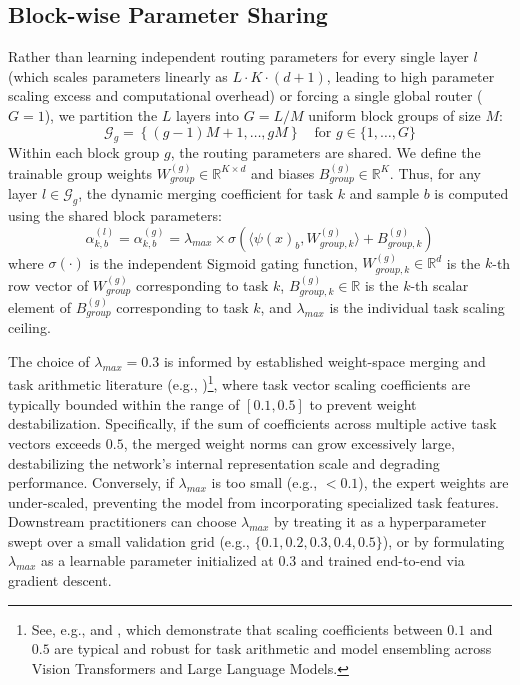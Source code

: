 \subsection{Block-wise Parameter Sharing}
Rather than learning independent routing parameters for every single layer $l$ (which scales parameters linearly as $L \cdot K \cdot (d + 1)$, leading to high parameter scaling excess and computational overhead) or forcing a single global router ($G=1$), we partition the $L$ layers into $G = L / M$ uniform block groups of size $M$:
\begin{equation}
    \mathcal{G}_g = \left\{ (g-1)M + 1, \dots, gM \right\} \quad \text{for } g \in \{1, \dots, G\}
\end{equation}
Within each block group $g$, the routing parameters are shared. We define the trainable group weights $W_{group}^{(g)} \in \mathbb{R}^{K \times d}$ and biases $B_{group}^{(g)} \in \mathbb{R}^K$. Thus, for any layer $l \in \mathcal{G}_g$, the dynamic merging coefficient for task $k$ and sample $b$ is computed using the shared block parameters:
\begin{equation}
    \alpha_{k, b}^{(l)} = \alpha_{k, b}^{(g)} = \lambda_{max} \times \sigma \left( \langle \psi(x)_b, W_{group, k}^{(g)} \rangle + B_{group, k}^{(g)} \right)
\end{equation}
where $\sigma(\cdot)$ is the independent Sigmoid gating function, $W_{group, k}^{(g)} \in \mathbb{R}^d$ is the $k$-th row vector of $W_{group}^{(g)}$ corresponding to task $k$, $B_{group, k}^{(g)} \in \mathbb{R}$ is the $k$-th scalar element of $B_{group}^{(g)}$ corresponding to task $k$, and $\lambda_{max}$ is the individual task scaling ceiling. 

The choice of $\lambda_{max} = 0.3$ is informed by established weight-space merging and task arithmetic literature (e.g., \cite{task_arithmetic})\footnote{See, e.g., \cite{wortsman2022model} and \cite{task_arithmetic}, which demonstrate that scaling coefficients between $0.1$ and $0.5$ are typical and robust for task arithmetic and model ensembling across Vision Transformers and Large Language Models.}, where task vector scaling coefficients are typically bounded within the range of $[0.1, 0.5]$ to prevent weight destabilization. Specifically, if the sum of coefficients across multiple active task vectors exceeds $0.5$, the merged weight norms can grow excessively large, destabilizing the network's internal representation scale and degrading performance. Conversely, if $\lambda_{max}$ is too small (e.g., $<0.1$), the expert weights are under-scaled, preventing the model from incorporating specialized task features. Downstream practitioners can choose $\lambda_{max}$ by treating it as a hyperparameter swept over a small validation grid (e.g., $\{0.1, 0.2, 0.3, 0.4, 0.5\}$), or by formulating $\lambda_{max}$ as a learnable parameter initialized at $0.3$ and trained end-to-end via gradient descent.

